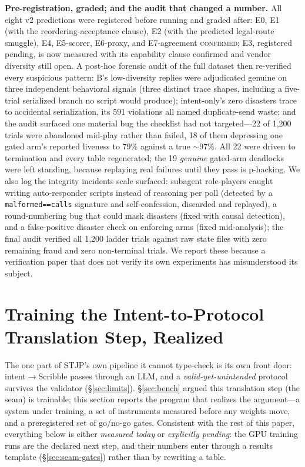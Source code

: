 \documentclass{article}
\newcommand{\stjp}{\textsc{STJP}}
\begin{document}
\textbf{Pre-registration, graded; and the audit that changed a number.} All eight v2 predictions were registered before running and graded after: E0, E1 (with the reordering-acceptance clause), E2 (with the predicted legal-route smuggle), E4, E5-scorer, E6-proxy, and E7-agreement \textsc{confirmed}; E3, registered pending, is now measured with its capability clause confirmed and vendor diversity still open. A post-hoc forensic audit of the full dataset then re-verified every suspicious pattern: B's low-diversity replies were adjudicated genuine on three independent behavioral signals (three distinct trace shapes, including a five-trial serialized branch no script would produce); intent-only's zero disasters trace to accidental serialization, its 591 violations all named duplicate-send waste; and the audit surfaced one material bug the checklist had not targeted---22 of 1{,}200 trials were abandoned mid-play rather than failed, 18 of them depressing one gated arm's reported liveness to 79\% against a true $\sim$97\%. All 22 were driven to termination and every table regenerated; the 19 \emph{genuine} gated-arm deadlocks were left standing, because replaying real failures until they pass is p-hacking. We also log the integrity incidents scale surfaced: subagent role-players caught writing auto-responder scripts instead of reasoning per poll (detected by a \texttt{malformed==calls} signature and self-confession, discarded and replayed), a round-numbering bug that could mask disasters (fixed with causal detection), and a false-positive disaster check on enforcing arms (fixed mid-analysis); the final audit verified all 1{,}200 ladder trials against raw state files with zero remaining fraud and zero non-terminal trials. We report these because a verification paper that does not verify its own experiments has misunderstood its subject.

\section{Training the Intent-to-Protocol Translation Step, Realized}\label{sec:seam}
The one part of \stjp{}'s own pipeline it cannot type-check is its own front door: intent$\to$Scribble passes through an LLM, and a \emph{valid-yet-unintended} protocol survives the validator (\S\ref{sec:limits}). \S\ref{sec:bench} argued this translation step (the seam) is trainable; this section reports the program that realizes the argument---a system under training, a set of instruments measured before any weights move, and a preregistered set of go/no-go gates. Consistent with the rest of this paper, everything below is either \emph{measured today} or \emph{explicitly pending}: the GPU training runs are the declared next step, and their numbers enter through a results template (\S\ref{sec:seam-gates}) rather than by rewriting a table.
\end{document}
